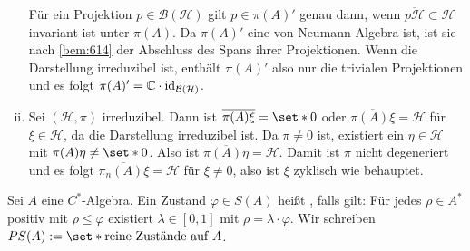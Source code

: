 \begin{beweis}
\begin{enumerate}[(i)]
		Für ein Projektion $p \in \mathcal{B}(\mathcal{H})$ gilt $p \in \pi(A)'$ genau dann, wenn $\overline{p \mathcal{H}} \subset \mathcal{H}$ invariant ist unter $\pi(A)$.
		Da $\pi(A)'$ eine von-Neumann-Algebra ist, ist sie nach \autoref{bem:614} der Abschluss des Spans ihrer Projektionen.
		Wenn die Darstellung irreduzibel ist, enthält $\pi(A)'$ also nur die trivialen Projektionen und es folgt $\pi(A)' = \mathbb{C} \cdot \operatorname{id}_{\mathcal{B}(\mathcal{H})}$.
		\item Sei $(\mathcal{H},\pi)$ irreduzibel.
		Dann ist $\overline{\pi(A)\xi}=\set*{0}$ oder $\overline{\pi(A)\xi}=\mathcal{H}$ für $\xi \in \mathcal{H}$, da die Darstellung irreduzibel ist.
		Da $\pi\neq 0$ ist, existiert ein $\eta \in \mathcal{H}$ mit $\pi(A)\eta \neq \set*{0}$.
		Also ist $\overline{\pi(A)\eta}=\mathcal{H}$.
		Damit ist $\pi$ nicht degeneriert und es folgt $\overline{\pi_n(A)\xi} = \mathcal{H}$ für $\xi\neq 0$, also ist $\xi$ zyklisch wie behauptet.\qedhere
	\end{enumerate}
\end{beweis}

\begin{definition}[{name=[reiner Zustand]}]
	Sei $A$ eine $C^*$-Algebra.
	Ein Zustand $\varphi \in S(A)$ heißt , falls gilt: Für jedes $\rho \in A^*$ positiv mit $\rho \le \varphi$ existiert $\lambda \in [0,1]$ mit $\rho= \lambda \cdot \varphi$.
	Wir schreiben $PS(A) := \set*{\text{reine Zustände auf }A}$.
\end{definition}

